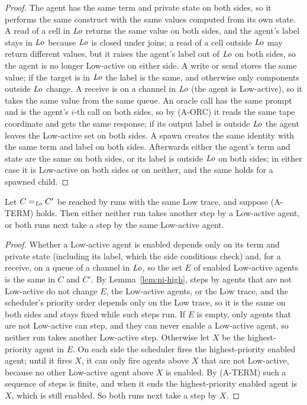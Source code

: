 \begin{proof}
The agent has the same term and private state on both sides, so it performs the same construct
with the same values computed from its own state.
A read of a cell in $\mathit{Lo}$ returns the same value on both sides, and the agent's label stays in
$\mathit{Lo}$ because $\mathit{Lo}$ is closed under joins; a read of a cell outside $\mathit{Lo}$ may return
different values, but it raises the agent's label out of $\mathit{Lo}$ on both sides, so the agent is
no longer Low-active on either side.
A write or send stores the same value; if the target is in $\mathit{Lo}$ the label is the same, and
otherwise only components outside $\mathit{Lo}$ change.
A receive is on a channel in $\mathit{Lo}$ (the agent is Low-active), so it takes the same value from
the same queue.
An oracle call has the same prompt and is the agent's $i$-th call on both sides, so by
(A-ORC) it reads the same tape coordinate and gets the same response; if its output label is
outside $\mathit{Lo}$ the agent leaves the Low-active set on both sides.
A spawn creates the same identity with the same term and label on both sides.
Afterwards either the agent's term and state are the same on both sides, or its label is outside
$\mathit{Lo}$ on both sides; in either case it is Low-active on both sides or on neither, and the same
holds for a spawned child.
\end{proof}

\begin{lemma}
\label{lem:ni-next}
Let $C =_{\mathit{Lo}} C'$ be reached by runs with the same Low trace, and suppose (A-TERM) holds.
Then either neither run takes another step by a Low-active agent, or both runs next take a
step by the same Low-active agent.
\end{lemma}

\begin{proof}
Whether a Low-active agent is enabled depends only on its term and private state (including its
label, which the side conditions check) and, for a receive, on a queue of a channel in $\mathit{Lo}$,
so the set $E$ of enabled Low-active agents is the same in $C$ and $C'$.
By Lemma~\ref{lem:ni-high}, steps by agents that are not Low-active do not change $E$, the
Low-active agents, or the Low trace, and the scheduler's priority order depends only on the Low
trace, so it is the same on both sides and stays fixed while such steps run.
If $E$ is empty, only agents that are not Low-active can step, and they can never enable a
Low-active agent, so neither run takes another Low-active step.
Otherwise let $X$ be the highest-priority agent in $E$.
On each side the scheduler fires the highest-priority enabled agent; until it fires $X$, it
can only fire agents above $X$ that are not Low-active, because no other Low-active agent above
$X$ is enabled.
By (A-TERM) such a sequence of steps is finite, and when it ends the highest-priority enabled
agent is $X$, which is still enabled.
So both runs next take a step by $X$.
\end{proof}


